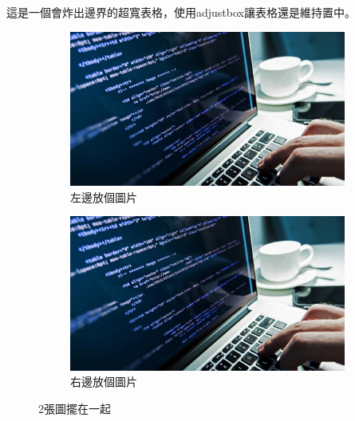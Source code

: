\begin{table}[ht]
    \renewcommand{\arraystretch}{1}

    \caption{這是一個會炸出邊界的超寬表格，使用adjustbox讓表格還是維持置中。}
    \label{tab:tabexample5}
\end{table}

\begin{figure}[hbpt]
    \centering
    \begin{subfigure}{0.45\linewidth}
        \includegraphics[width=\textwidth]{Figures/computer_science.jpg}
        \caption{左邊放個圖片}
    \end{subfigure}
    \hfill
    \begin{subfigure}{0.45\linewidth}
        \includegraphics[width=\textwidth]{Figures/computer_science.jpg}
        \caption{右邊放個圖片}
    \end{subfigure}
    \caption{2張圖擺在一起}
    \label{fig:figexample2}
\end{figure}

